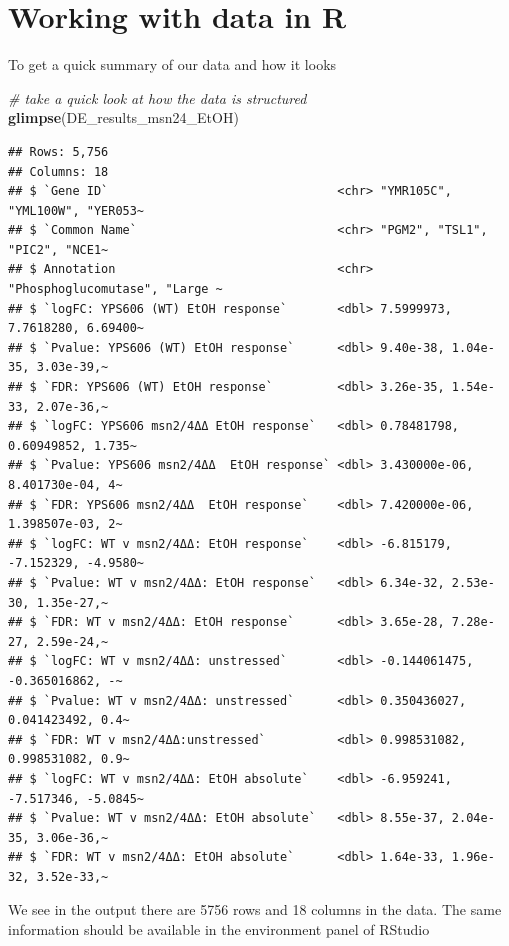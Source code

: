 \documentclass[
]{book}
\newenvironment{Shaded}{\begin{snugshade}}{\end{snugshade}}
\newcommand{\CommentTok}[1]{\textcolor[rgb]{0.56,0.35,0.01}{\textit{#1}}}
\newcommand{\FunctionTok}[1]{\textcolor[rgb]{0.13,0.29,0.53}{\textbf{#1}}}
\newcommand{\NormalTok}[1]{#1}
\begin{document}
\hypertarget{working-with-data-in-r}{%
\section{Working with data in R}\label{working-with-data-in-r}}

To get a quick summary of our data and how it looks

\begin{Shaded}
\begin{Highlighting}[]
\CommentTok{\# take a quick look at how the data is structured}
\FunctionTok{glimpse}\NormalTok{(DE\_results\_msn24\_EtOH)}
\end{Highlighting}
\end{Shaded}

\begin{verbatim}
## Rows: 5,756
## Columns: 18
## $ `Gene ID`                                <chr> "YMR105C", "YML100W", "YER053~
## $ `Common Name`                            <chr> "PGM2", "TSL1", "PIC2", "NCE1~
## $ Annotation                               <chr> "Phosphoglucomutase", "Large ~
## $ `logFC: YPS606 (WT) EtOH response`       <dbl> 7.5999973, 7.7618280, 6.69400~
## $ `Pvalue: YPS606 (WT) EtOH response`      <dbl> 9.40e-38, 1.04e-35, 3.03e-39,~
## $ `FDR: YPS606 (WT) EtOH response`         <dbl> 3.26e-35, 1.54e-33, 2.07e-36,~
## $ `logFC: YPS606 msn2/4ΔΔ EtOH response`   <dbl> 0.78481798, 0.60949852, 1.735~
## $ `Pvalue: YPS606 msn2/4ΔΔ  EtOH response` <dbl> 3.430000e-06, 8.401730e-04, 4~
## $ `FDR: YPS606 msn2/4ΔΔ  EtOH response`    <dbl> 7.420000e-06, 1.398507e-03, 2~
## $ `logFC: WT v msn2/4ΔΔ: EtOH response`    <dbl> -6.815179, -7.152329, -4.9580~
## $ `Pvalue: WT v msn2/4ΔΔ: EtOH response`   <dbl> 6.34e-32, 2.53e-30, 1.35e-27,~
## $ `FDR: WT v msn2/4ΔΔ: EtOH response`      <dbl> 3.65e-28, 7.28e-27, 2.59e-24,~
## $ `logFC: WT v msn2/4ΔΔ: unstressed`       <dbl> -0.144061475, -0.365016862, -~
## $ `Pvalue: WT v msn2/4ΔΔ: unstressed`      <dbl> 0.350436027, 0.041423492, 0.4~
## $ `FDR: WT v msn2/4ΔΔ:unstressed`          <dbl> 0.998531082, 0.998531082, 0.9~
## $ `logFC: WT v msn2/4ΔΔ: EtOH absolute`    <dbl> -6.959241, -7.517346, -5.0845~
## $ `Pvalue: WT v msn2/4ΔΔ: EtOH absolute`   <dbl> 8.55e-37, 2.04e-35, 3.06e-36,~
## $ `FDR: WT v msn2/4ΔΔ: EtOH absolute`      <dbl> 1.64e-33, 1.96e-32, 3.52e-33,~
\end{verbatim}

We see in the output there are 5756 rows and 18 columns in the data. The same information should be available in the environment panel of RStudio
\end{document}
